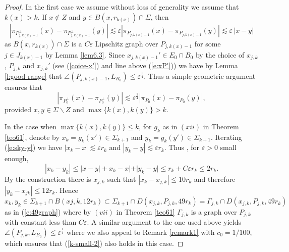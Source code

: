 \documentclass[11pt]{amsart}
\newcommand{\rf}[1]{{(\ref{#1})}}
\newcommand{\ve}{{\varepsilon}}
\theoremstyle{definition}
\theoremstyle{remark}
\numberwithin{equation}{section}
\def\lec{\lesssim}
\def\lec{\lesssim}
\begin{document}
\begin{proof}
{ In the first case we assume
 without loss of generality we assume that $k(x)>k$. If $x\not\in Z$ and $y\in B(x,r_{k(x)})\cap \Sigma$, then 
  \begin{equation}\label{k-small} 
 |\pi_{P_{j,k(x)-1}^{\perp}}(x)-\pi_{P_{j,k(x)-1}^{\perp}}(y)|\lec \ve |\pi_{P_{j,k(x)-1}}(x)-\pi_{P_{j,k(x)-1}}(y)|\lec \ve\,|x-y| 
 \end{equation}
 as $B(x,r_{k(x)})\cap \Sigma$ is a $C\ve$ Lipschitz graph over $P_{j,k(x)-1}$ for some $j\in J_{ k(x)-1}$ by Lemma \ref{lem6.3}. Since $x_{j,k(x)-1}'\in E_0\cap B_0$ by the choice of $x_{j,k}$, $P_{j,k}$ and $x_{j,k}'$ (see \rf{coice-x'} and line above \rf{e:xP'}) we have by Lemma \ref{l:good-range} that $\angle(P_{j,k(x)-1},L_{B_{0}})\leq \ve^{\frac{1}{4}}$. Thus a simple geometric argument ensures that 
 \begin{equation}\label{k-small-2} 
 |\pi_{P_{0}^{\perp}}(x)-\pi_{P_{0}^{\perp}}(y)| \lec\ve^\frac{1}{4}|\pi_{P_{0}}(x)-\pi_{P_{0}}(y)|,
 \end{equation}
 provided $x,y\in \Sigma\backslash Z$ and $\max\{k(x),k(y)\}>k$.
 
 In the case when $\max\{k(x),k(y)\}\le k$, for $g_k$ as in $(xii)$ in Theorem \ref{teo61}, denote by $x_k=g_k(x')\in \Sigma_{k+1}$ and $y_k=g_k(y')\in \Sigma_{k+1}$. Iterating \rf{e:sky-y} we have $|x_k-x|\lec \ve r_k$ and $|y_k-y|\lec \ve r_k$. Thus , for $\ve>0$ small enough,
 \[
 |x_k-y_k|\le |x-y|+x_k-x|+|y_k-y|\le r_k + C\ve r_k\le 2r_k.
 \]
By the construction there is $x_{j,k}$ such that $|x_k-x_{j,k}|\le 10 r_k$ and 
 therefore $|y_k-x_{jk}|\le 12r_k$. Hence 
 \[
 x_k,y_k\in \Sigma_{k+1}\cap B(x{j,k}, 12 r_k)\subset \Sigma_{k+1}\cap D(x_{j,k}, P_{j,k}, 49 r_k)=\Gamma_{j,k}\cap D(x_{j,k}, P_{j,k}, 49 r_k)
 \]
 as in \rf{e:49graph} where
 by $(vii)$ in Theorem \ref{teo61} $\Gamma_{j,k}$ is a graph over $P_{j,k}$ with constant less than $C\ve$. A similar argument to the one used above yields $\angle(P_{j,k},L_{B_{0}})\leq \ve^{\frac{1}{4}}$ where we 
 also appeal to Remark \ref{remark1} with $c_0=1/100$, which ensures that \rf{k-small-2} also holds in this case. 
 
}
\end{proof}
\end{document}
